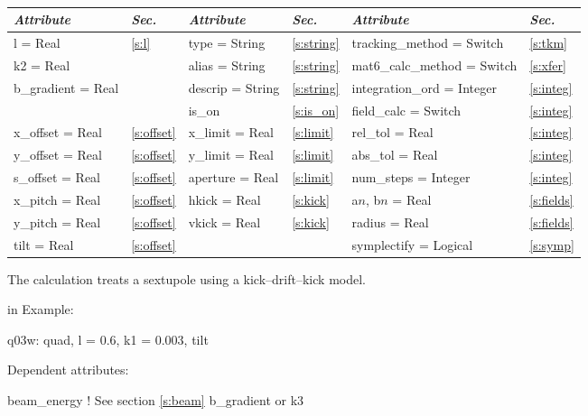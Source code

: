 \toffset
\begin{center}
\tt
\begin{tabular}{|l|l||l|l||l|l|} \hline
  {\sl Attribute} & {\sl Sec.}  & {\sl Attribute} & {\sl Sec.} & {\sl Attribute} & {\sl Sec.} \\ \hline
  l        = Real       & \ref{s:l}      & type = String      & \ref{s:string} & tracking\_method = Switch   & \ref{s:tkm}   \\ \hline
  k2       = Real       &                & alias = String     & \ref{s:string} & mat6\_calc\_method = Switch & \ref{s:xfer}  \\ \hline
  b\_gradient = Real    &                & descrip = String   & \ref{s:string} & integration\_ord = Integer  & \ref{s:integ} \\ \hline
                        &                & is\_on             & \ref{s:is_on}  & field\_calc = Switch        & \ref{s:integ} \\ \hline
  x\_offset  = Real     & \ref{s:offset} & x\_limit = Real    & \ref{s:limit}  & rel\_tol = Real             & \ref{s:integ} \\ \hline
  y\_offset  = Real     & \ref{s:offset} & y\_limit = Real    & \ref{s:limit}  & abs\_tol = Real             & \ref{s:integ} \\ \hline
  s\_offset  = Real     & \ref{s:offset} & aperture = Real    & \ref{s:limit}  & num\_steps = Integer        & \ref{s:integ} \\ \hline
  x\_pitch = Real       & \ref{s:offset} & hkick    = Real    & \ref{s:kick}   & a$n$, b$n$ = Real           & \ref{s:fields}\\ \hline
  y\_pitch = Real       & \ref{s:offset} & vkick    = Real    & \ref{s:kick}   & radius = Real               & \ref{s:fields}\\ \hline
  tilt     = Real       & \ref{s:offset} &                    &                & symplectify = Logical       & \ref{s:symp}  \\ \hline
\end{tabular}
\end{center}
\toffset

The  calculation treats a sextupole using a kick--drift--kick model.

 in \noindent
Example:
\begin{example}
  q03w: quad, l = 0.6, k1 = 0.003, tilt
\end{example}

\vskip0.05in \noindent
Dependent attributes:
\begin{example}
  beam\_energy  ! See section \ref{s:beam}
  b\_gradient or k3
\end{example}


